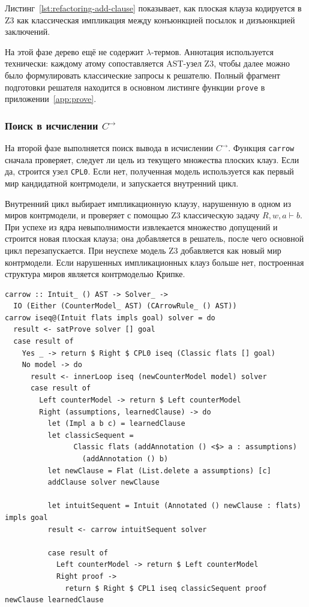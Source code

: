 \documentclass[14pt, russian]{scrartcl}
\begin{document}
Листинг~\ref{lst:refactoring-add-clause} показывает, как плоская клауза
кодируется в Z3 как классическая импликация между конъюнкцией посылок и
дизъюнкцией заключений.

На этой фазе дерево ещё не содержит $\lambda$-термов. Аннотация используется
технически: каждому атому сопоставляется AST-узел Z3, чтобы далее можно было
формулировать классические запросы к решателю. Полный фрагмент подготовки
решателя находится в основном листинге функции \texttt{prove} в
приложении~\ref{app:prove}.

\subsubsection{Поиск в исчислении \texorpdfstring{$C^{\rightarrow}$}{C->}}

На второй фазе выполняется поиск вывода в исчислении $C^{\rightarrow}$.
Функция \texttt{carrow} сначала проверяет, следует ли цель из текущего
множества плоских клауз. Если да, строится узел \texttt{CPL0}. Если нет,
полученная модель используется как первый мир кандидатной контрмодели, и
запускается внутренний цикл.

Внутренний цикл выбирает импликационную клаузу, нарушенную в одном из миров
контрмодели, и проверяет с помощью Z3 классическую задачу
$R, w, a \vdash b$. При успехе из ядра невыполнимости извлекается множество
допущений и строится новая плоская клауза; она добавляется в решатель, после
чего основной цикл перезапускается. При неуспехе модель Z3 добавляется как
новый мир контрмодели. Если нарушенных импликационных клауз больше нет,
построенная структура миров является контрмоделью Крипке.

\begin{listing}[!htb]
\caption{Основной цикл поиска вывода в $C^{\rightarrow}$}
\label{lst:refactoring-carrow}
\begin{verbatim}
carrow :: Intuit_ () AST -> Solver_ ->
  IO (Either (CounterModel_ AST) (CArrowRule_ () AST))
carrow iseq@(Intuit flats impls goal) solver = do
  result <- satProve solver [] goal
  case result of
    Yes _ -> return $ Right $ CPL0 iseq (Classic flats [] goal)
    No model -> do
      result <- innerLoop iseq (newCounterModel model) solver
      case result of
        Left counterModel -> return $ Left counterModel
        Right (assumptions, learnedClause) -> do
          let (Impl a b c) = learnedClause
          let classicSequent =
                Classic flats (addAnnotation () <$> a : assumptions)
                  (addAnnotation () b)
          let newClause = Flat (List.delete a assumptions) [c]
          addClause solver newClause

          let intuitSequent = Intuit (Annotated () newClause : flats) impls goal
          result <- carrow intuitSequent solver

          case result of
            Left counterModel -> return $ Left counterModel
            Right proof ->
              return $ Right $ CPL1 iseq classicSequent proof newClause learnedClause
\end{verbatim}
\end{listing}
\end{document}
